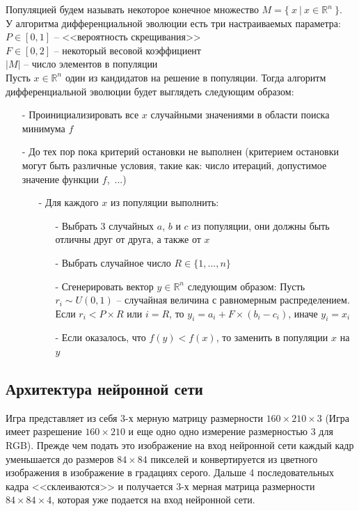 \documentclass[12pt]{article}
\begin{document}
        Популяцией будем называть некоторое конечное множество $M=\{~x~|~x \in \mathbb{R}^n~\}$. \\

        У алгоритма дифференциальной эволюции есть три настраиваемых параметра: \\ 
        $P \in [0, 1]$ -- <<вероятность скрещивания>> \\
        $F \in [0, 2]$ -- некоторый весовой коэффициент \\
        $|M|$ -- число элементов в популяции \\

        Пусть $x \in \mathbb{R}^n$ один из кандидатов на решение в популяции. Тогда алгоритм дифференциальной эволюции будет выглядеть следующим образом:

        \begin{itemize}
            \item[-] Проинициализировать все $x$ случайными значениями в области поиска минимума $f$
            \item[-] До тех пор пока критерий остановки не выполнен (критерием остановки могут быть различные условия, такие как: число итераций, допустимое значение функции $f$,~...)
            \begin{itemize}
                \item[-] Для каждого $x$ из популяции выполнить:
                \begin{itemize}
                    \item[-] Выбрать 3 случайных $a$, $b$ и $c$ из популяции, они должны быть отличны друг от друга, а также от $x$
                    \item[-] Выбрать случайное число $R \in \{1, ..., n\}$
                    \item[-] Сгенерировать вектор $y \in \mathbb{R}^n$ следующим образом: Пусть $r_i \sim U(0, 1)$ -- случайная величина с равномерным распределением. Если $r_i < P \times R$ или $i = R$, то $y_i = a_i + F \times (b_i - c_i)$, иначе $y_i = x_i$
                    \item[-] Если оказалось, что $f(y) < f(x)$, то заменить в популяции $x$ на $y$
                \end{itemize}
            \end{itemize}
        \end{itemize}

        \subsection{Архитектура нейронной сети}
            Игра представляет из себя $3$-х мерную матрицу размерности $160 \times 210 \times 3$ (Игра имеет разрешение $160 \times 210$ и еще одно одно измерение размерностью $3$ для RGB). Прежде чем подать это изображение на вход нейронной сети каждый кадр уменьшается до размеров $84 \times 84$ пикселей и конвертируется из цветного изображения в изображение в градациях серого. Дальше 4 последовательных кадра <<склеиваются>> и получается $3$-х мерная матрица размерности $84 \times 84 \times 4$, которая уже подается на вход нейронной сети. \\
\end{document}
